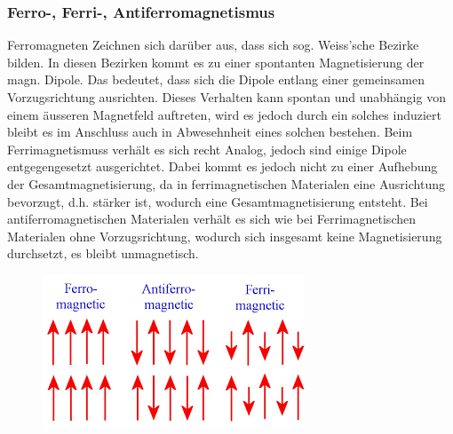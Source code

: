         \subsubsection*{Ferro-, Ferri-, Antiferromagnetismus}
            Ferromagneten Zeichnen sich darüber aus, dass sich sog. Weiss'sche Bezirke bilden. In diesen Bezirken
            kommt es zu einer spontanten Magnetisierung der magn. Dipole. Das bedeutet, dass sich die Dipole entlang einer
            gemeinsamen Vorzugsrichtung ausrichten. Dieses Verhalten kann spontan und unabhängig von einem äusseren Magnetfeld
            auftreten, wird es jedoch durch ein solches induziert bleibt es im Anschluss auch in Abwesehnheit eines solchen bestehen.
            Beim Ferrimagnetismuss verhält es sich recht Analog, jedoch sind einige Dipole entgegengesetzt ausgerichtet.
            Dabei kommt es jedoch nicht zu einer Aufhebung der Gesamtmagnetisierung, da in ferrimagnetischen Materialen
            eine Ausrichtung bevorzugt, d.h. stärker ist, wodurch eine Gesamtmagnetisierung entsteht.
            Bei antiferromagnetischen Materialen verhält es sich wie bei Ferrimagnetischen Materialen ohne Vorzugsrichtung,
            wodurch sich insgesamt keine Magnetisierung durchsetzt, es bleibt unmagnetisch.
            \begin{figure}[H]
                \centering
                \includegraphics{Images/ferroferrianti.png}
            \end{figure}
